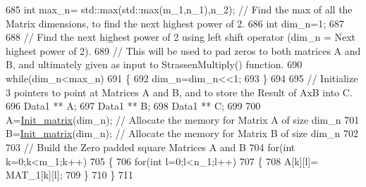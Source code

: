 \begin{DoxyCode}
685                                                 \textcolor{keywordtype}{int} max\_n= std::max(std::max(m\_1,n\_1),n\_2); \textcolor{comment}{// Find the max
       of all the Matrix dimensions, to find the next highest power of 2.}
686                                                 \textcolor{keywordtype}{int} dim\_n=1;
687 
688                                                 \textcolor{comment}{// Find the next highest power of 2 using left shift
       operator (dim\_n = Next highest power of 2).}
689                                                 \textcolor{comment}{// This will be used to pad zeros to both matrices A and B,
       and ultimately given as input to StrassenMultiply() function.}
690                                                 \textcolor{keywordflow}{while}(dim\_n<max\_n)
691                                                 \{
692                                                         dim\_n=dim\_n<<1;
693                                                 \}
694 
695                                                 \textcolor{comment}{// Initialize 3 pointers to point at Matrices A and B, and
       to store the Result of AxB into C.}
696                                                 Data1 ** A;
697                                                 Data1 ** B;
698                                                 Data1 ** C;
699 
700                                                 A=\hyperlink{classMATOPS_1_1BigMatrix_a2730be4ce100cfdbaf1240703bd9cfb9}{Init\_matrix}(dim\_n); \textcolor{comment}{// Allocate the memory for
       Matrix A of size dim\_n}
701                                                 B=\hyperlink{classMATOPS_1_1BigMatrix_a2730be4ce100cfdbaf1240703bd9cfb9}{Init\_matrix}(dim\_n); \textcolor{comment}{// Allocate the memory for
       Matrix B of size dim\_n}
702 
703                                                 \textcolor{comment}{// Build the Zero padded square Matrices A and B}
704                                                         \textcolor{keywordflow}{for}(\textcolor{keywordtype}{int} k=0;k<m\_1;k++)
705                                                         \{
706                                                                 \textcolor{keywordflow}{for}(\textcolor{keywordtype}{int} l=0;l<n\_1;l++)
707                                                                 \{
708                                                                         A[k][l]= MAT\_1[k][l];
709                                                                 \}
710                                                         \}
711 

\end{DoxyCode}
